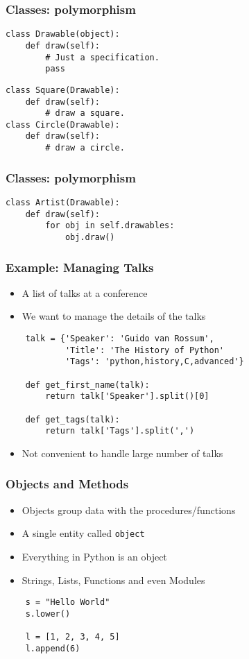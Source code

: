 \begin{frame}[fragile]
  \frametitle{Classes: polymorphism}
\begin{lstlisting}
class Drawable(object):
    def draw(self):
        # Just a specification.
        pass
\end{lstlisting}
\begin{lstlisting}
class Square(Drawable):
    def draw(self):
        # draw a square.
class Circle(Drawable):
    def draw(self):
        # draw a circle.
\end{lstlisting}
\end{frame}
\begin{frame}[fragile]
  \frametitle{Classes: polymorphism}
\begin{lstlisting}
class Artist(Drawable):
    def draw(self):
        for obj in self.drawables:
            obj.draw()
\end{lstlisting}
\end{frame}



\begin{frame}[fragile]
  \frametitle{Example: Managing Talks}
  \begin{itemize}
  \item A list of talks at a conference
  \item We want to manage the details of the talks
  \end{itemize}
  \begin{lstlisting}
    talk = {'Speaker': 'Guido van Rossum', 
            'Title': 'The History of Python'
            'Tags': 'python,history,C,advanced'} 

    def get_first_name(talk):
        return talk['Speaker'].split()[0]

    def get_tags(talk):
        return talk['Tags'].split(',')
  \end{lstlisting}
  \begin{itemize}
  \item Not convenient to handle large number of talks
  \end{itemize}
\end{frame}

\begin{frame}[fragile]
  \frametitle{Objects and Methods}
  \begin{itemize}
  \item Objects group data with the procedures/functions
  \item A single entity called \texttt{object}
  \item Everything in Python is an object
  \item Strings, Lists, Functions and even Modules
  \end{itemize}
  \begin{lstlisting}
    s = "Hello World"
    s.lower()

    l = [1, 2, 3, 4, 5]
    l.append(6)
  \end{lstlisting}
\end{frame}

